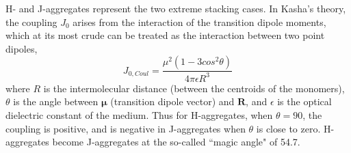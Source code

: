 H- and J-aggregates represent the two extreme stacking cases. In Kasha's theory, the coupling $J_{0}$ arises from the interaction of the transition dipole moments, which at its most crude can be treated as the interaction between two point dipoles,
\begin{equation}
    J_{0,Coul}=\frac{\mu^{2}(1-3cos^{2}\theta)}{4\pi\epsilon{}R^3}
\end{equation}
where $R$ is the intermolecular distance (between the centroids of the monomers), $\theta$ is the angle between  $\bm{\mu}$ (transition dipole vector) and $\bm{R}$, and $\epsilon$ is the optical dielectric constant of the medium. Thus for H-aggregates, when $\theta=90$, the coupling is positive, and is negative in J-aggregates when $\theta$ is close to zero. H-aggregates become J-aggregates at the so-called ``magic angle" of 54.7\textdegree.\cite{Hestand2018}

